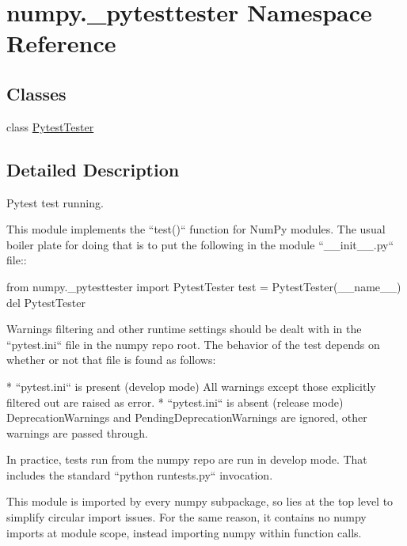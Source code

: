 \hypertarget{namespacenumpy_1_1__pytesttester}{}\section{numpy.\+\_\+pytesttester Namespace Reference}
\label{namespacenumpy_1_1__pytesttester}
\subsection*{Classes}
\begin{DoxyCompactItemize}
\item 
class \hyperlink{classnumpy_1_1__pytesttester_1_1PytestTester}{Pytest\+Tester}
\end{DoxyCompactItemize}


\subsection{Detailed Description}
\begin{DoxyVerb}Pytest test running.

This module implements the ``test()`` function for NumPy modules. The usual
boiler plate for doing that is to put the following in the module
``__init__.py`` file::

from numpy._pytesttester import PytestTester
test = PytestTester(__name__)
del PytestTester


Warnings filtering and other runtime settings should be dealt with in the
``pytest.ini`` file in the numpy repo root. The behavior of the test depends on
whether or not that file is found as follows:

* ``pytest.ini`` is present (develop mode)
All warnings except those explicitly filtered out are raised as error.
* ``pytest.ini`` is absent (release mode)
DeprecationWarnings and PendingDeprecationWarnings are ignored, other
warnings are passed through.

In practice, tests run from the numpy repo are run in develop mode. That
includes the standard ``python runtests.py`` invocation.

This module is imported by every numpy subpackage, so lies at the top level to
simplify circular import issues. For the same reason, it contains no numpy
imports at module scope, instead importing numpy within function calls.
\end{DoxyVerb}
 